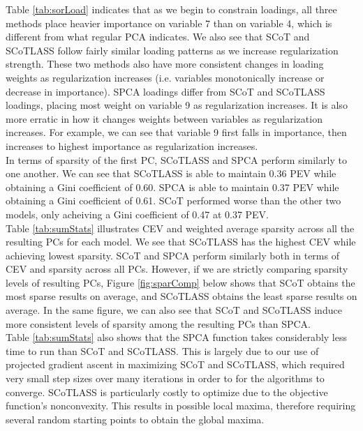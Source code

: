 \documentclass[11pt,letterpaper]{report}
\begin{document}
Table \ref{tab:sorLoad} indicates that as we begin to constrain loadings, all three methods place heavier importance on variable 7 than on variable 4, which is different from what regular PCA indicates. We also see that SCoT and SCoTLASS follow fairly similar loading patterns as we increase regularization strength. These two methods also have more consistent changes in loading weights as regularization increases (i.e. variables monotonically increase or decrease in importance). SPCA loadings differ from SCoT and SCoTLASS loadings, placing most weight on variable 9 as regularization increases. It is also more erratic in how it changes weights between variables as regularization increases. For example, we can see that variable 9 first falls in importance, then increases to highest importance as regularization increases.\\

In terms of sparsity of the first PC, SCoTLASS and SPCA perform similarly to one another. We can see that SCoTLASS is able to maintain 0.36 PEV while obtaining a Gini coefficient of 0.60. SPCA is able to maintain 0.37 PEV while obtaining a Gini coefficient of 0.61. SCoT performed worse than the other two models, only acheiving a Gini coefficient of 0.47 at 0.37 PEV.\\

Table \ref{tab:sumStats} illustrates CEV and weighted average sparsity across all the resulting PCs for each model. We see that SCoTLASS has the highest CEV while achieving lowest sparsity. SCoT and SPCA perform similarly both in terms of CEV and sparsity across all PCs. However, if we are strictly comparing sparsity levels of resulting PCs, Figure \ref{fig:sparComp} below shows that SCoT obtains the most sparse results on average, and SCoTLASS obtains the least sparse results on average. In the same figure, we can also see that SCoT and SCoTLASS induce more consistent levels of sparsity among the resulting PCs than SPCA.\\

Table \ref{tab:sumStats} also shows that the SPCA function takes considerably less time to run than SCoT and SCoTLASS. This is largely due to our use of projected gradient ascent in maximizing SCoT and SCoTLASS, which required very small step sizes over many iterations in order to for the algorithms to converge. SCoTLASS is particularly costly to optimize due to the objective function's nonconvexity. This results in possible local maxima, therefore requiring several random starting points to obtain the global maxima.\\
\end{document}
